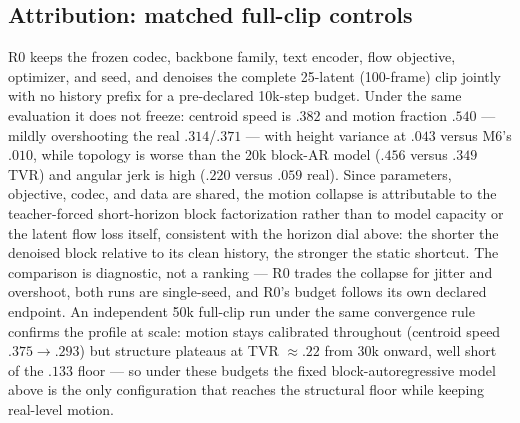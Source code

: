\documentclass[10pt,twocolumn]{article}
\begin{document}
\subsection{Attribution: matched full-clip controls}
R0 keeps the frozen codec, backbone family, text encoder, flow objective,
optimizer, and seed, and denoises the complete 25-latent (100-frame) clip jointly with no history prefix for a
pre-declared 10k-step budget. Under the same evaluation it does not freeze: centroid speed is $.382$ and motion
fraction $.540$ — mildly overshooting the real $.314$/$.371$ — with height variance at $.043$ versus M6's $.010$,
while topology is worse than the 20k block-AR model ($.456$ versus $.349$ TVR) and angular jerk is high ($.220$
versus $.059$ real). Since parameters, objective, codec, and data are shared, the motion collapse is attributable to
the teacher-forced short-horizon block factorization rather than to model capacity or the latent flow loss itself,
consistent with the horizon dial above: the shorter the denoised block relative to its clean history, the stronger the
static shortcut. The comparison is diagnostic, not a ranking — R0 trades the collapse for jitter and overshoot, both
runs are single-seed, and R0's budget follows its own declared endpoint. An independent 50k full-clip run under the
same convergence rule confirms the profile at scale: motion stays calibrated throughout (centroid speed
$.375{\to}.293$) but structure plateaus at TVR $\approx.22$ from 30k onward, well short of the $.133$ floor — so
under these budgets the fixed block-autoregressive model above is the only configuration that reaches the structural
floor while keeping real-level motion.
\end{document}
